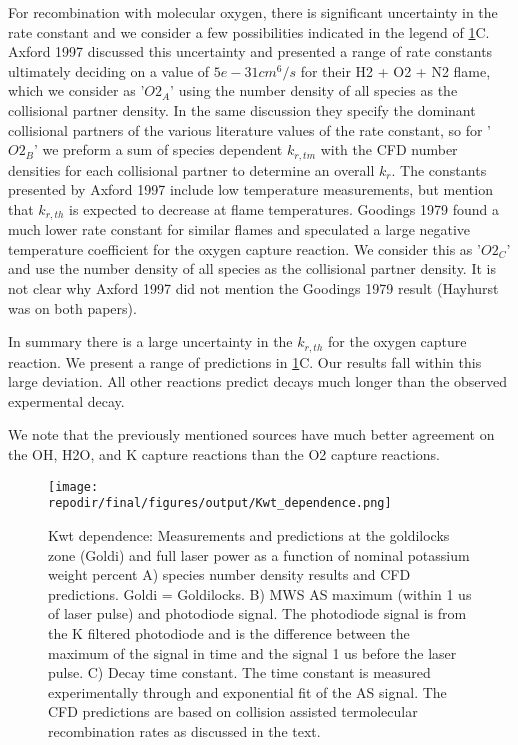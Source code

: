 For recombination with molecular oxygen, there is significant uncertainty in the rate constant and we consider a few possibilities indicated in the legend of \ref{fig:kwt_dependence}C. Axford 1997 discussed this uncertainty and presented a range of rate constants ultimately deciding on a value of $5e-31 cm^6/s$ for their H2 + O2 + N2 flame, which we consider as '$O2_A$' using the number density of all species as the collisional partner density. In the same discussion they specify the dominant collisional partners of the various literature values of the rate constant, so for '$O2_B$' we preform a sum of species dependent $k_{r,tm}$ with the CFD number densities for each collisional partner to determine an overall $k_r$. The constants presented by Axford 1997 include low temperature measurements, but mention that $k_{r,th}$ is expected to decrease at flame temperatures. Goodings 1979 found a much lower rate constant for similar flames and speculated a large negative temperature coefficient for the oxygen capture reaction. We consider this as '$O2_C$' and use the number density of all species as the collisional partner density. It is not clear why Axford 1997 did not mention the Goodings 1979 result (Hayhurst was on both papers). 

In summary there is a large uncertainty in the $k_{r,th}$ for the oxygen capture reaction. We present a range of predictions in \ref{fig:kwt_dependence}C. Our results fall within this large deviation. All other reactions predict decays much longer than the observed expermental decay. 

We note that the previously mentioned sources have much better agreement on the OH, H2O, and K capture reactions than the O2 capture reactions. 



\begin{figure}[h]
    \texttt{[image: \\repodir/final/figures/output/Kwt\_dependence.png]} 
    \caption{Kwt dependence: Measurements and predictions at the goldilocks zone (Goldi) and full laser power as a function of nominal potassium weight percent A) species number density results and CFD predictions. Goldi = Goldilocks. B) MWS AS maximum (within 1 us of laser pulse) and photodiode signal. The photodiode signal is from the K filtered photodiode and is the difference between the maximum of the signal in time and the signal 1 us before the laser pulse. C) Decay time constant. The time constant is measured experimentally through and exponential fit of the AS signal. The CFD predictions are based on collision assisted termolecular recombination rates as discussed in the text. }
    \label{fig:kwt_dependence}
\end{figure}

